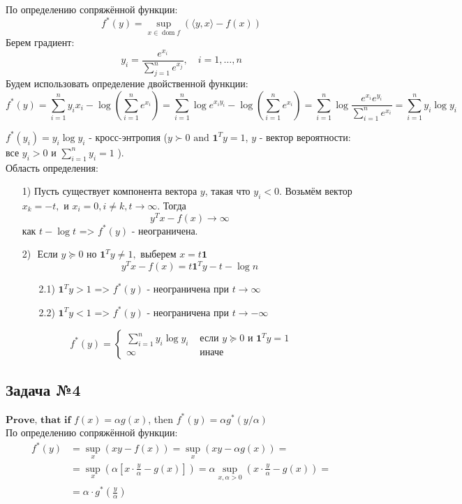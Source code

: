 \documentclass[12pt,letterpaper]{article}
\begin{document}
По определению сопряжённой функции: 
$$
f^{*}(y)=\sup _{x \in \operatorname{dom} f}(\langle y, x\rangle-f(x))
$$
Берем градиент: 
$$
y_{i}=\frac{e^{x_{i}}}{\sum_{j=1}^{n} e^{x_{j}}}, \quad i=1, \ldots, n
$$
Будем использовать определение двойственной функции:
$$
f^*(y) = \sum\limits_{i=1}^n y_i x_i - \log \left( \sum\limits_{i=1}^n e^{x_i} \right) = \sum\limits_{i=1}^n \log e^{x_i y_i} - \log \left( \sum\limits_{i=1}^n e^{x_i} \right) = \sum\limits_{i=1}^n
 \log  \frac {e^{x_i} e^{y_i} }{ \sum\limits_{i=1}^n e^{x_i} } = \sum\limits_{i=1}^n y_i \log y_i
$$

$ f^*(y_i) = y_i \log y_i $ - кросс-энтропия ($y \succ 0 \text { and } \mathbf{1}^{T} y=1$, $ y $ - вектор вероятности: все $ y_i > 0 $ и $ \sum \limits_{i = 1}^n y_i = 1 $  ). \\
Область определения: 
\begin{itemize}
\item[1)] Пусть существует компонента вектора $ y $, такая что $ y_i < 0 $. Возьмём вектор $x_{k}=-t, \text { и } x_{i}=0, i \neq k, t\rightarrow \infty$. Тогда $$ y^{T} x-f(x) \rightarrow\infty$$ как $ t - \log t $ => $ f^*(y) $ - неограничена. 
\item[2)] $ \text { Если } y \succeq 0 \text { но } \mathbf{1}^{T} y \neq 1, \text { выберем } x=t \mathbf{1}$
$$
y^{T} x-f(x)=t \mathbf{1}^{T} y-t-\log n
$$
\begin{itemize}
	\item[2.1)] $ \mathbf{1}^{T} y > 1 $ => $ f^*(y) $ - неограничена при $ t \rightarrow \infty $
	\item[2.2)] $ \mathbf{1}^{T} y < 1 $ =>  $ f^*(y) $ - неограничена при $ t \rightarrow -\infty $
\end{itemize}
\end{itemize}

$$
f^{*}(y)=\left\{\begin{array}{ll}
\sum_{i=1}^{n} y_{i} \log y_{i} & \text { если } y \succeq 0 \text { и } \mathbf{1}^{T} y=1 \\
\infty & \text { иначе }
\end{array}\right.
$$

\subsection*{Задача №4}
$\textbf{Prove, that if}$ $f(x) = \alpha g(x)$, then $f^*(y) = \alpha g^*(y/\alpha)$\\

По определению сопряжённой функции: 
$$
\begin{aligned}
f^{*}(y) &=\sup _{x} (x y-f(x))=\sup _{x}(x y-\alpha g(x))=\\
&=\sup _{x} \left(\alpha\left[x \cdot \frac{y}{\alpha}-g(x)\right]\right)=\alpha \sup _{x, \alpha>0} \left(x \cdot \frac{y}{\alpha}-g(x)\right) =\\
&= \alpha \cdot g^* \left( \frac{y}{\alpha} \right)
\end{aligned}
$$
\end{document}
